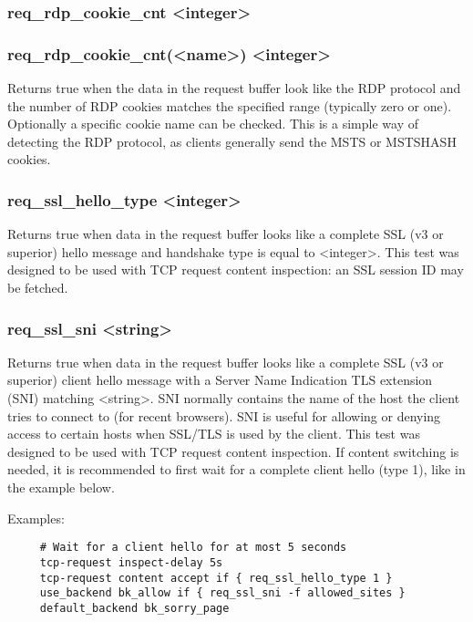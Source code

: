 \subsubsection[req\_rdp\_cookie\_cnt]{req\_rdp\_cookie\_cnt <integer>}
\subsubsection*{req\_rdp\_cookie\_cnt(<name>) <integer>}
  Returns true when the data in the request buffer look like the RDP protocol
  and the number of RDP cookies matches the specified range (typically zero or
  one). Optionally a specific cookie name can be checked. This is a simple way
  of detecting the RDP protocol, as clients generally send the MSTS or MSTSHASH
  cookies.

\subsubsection[req\_ssl\_hello\_type]{req\_ssl\_hello\_type <integer>}
  Returns true when data in the request buffer looks like a complete SSL (v3
  or superior) hello message and handshake type is equal to <integer>.
  This test was designed to be used with TCP request content inspection: an
  SSL session ID may be fetched.

\subsubsection[req\_ssl\_sni]{req\_ssl\_sni <string>}
  Returns true when data in the request buffer looks like a complete SSL (v3
  or superior) client hello message with a Server Name Indication TLS extension
  (SNI) matching <string>. SNI normally contains the name of the host the
  client tries to connect to (for recent browsers). SNI is useful for allowing
  or denying access to certain hosts when SSL/TLS is used by the client. This
  test was designed to be used with TCP request content inspection. If content
  switching is needed, it is recommended to first wait for a complete client
  hello (type 1), like in the example below.

  Examples:
  \begin{verbatim}
     # Wait for a client hello for at most 5 seconds
     tcp-request inspect-delay 5s
     tcp-request content accept if { req_ssl_hello_type 1 }
     use_backend bk_allow if { req_ssl_sni -f allowed_sites }
     default_backend bk_sorry_page  
  \end{verbatim}

